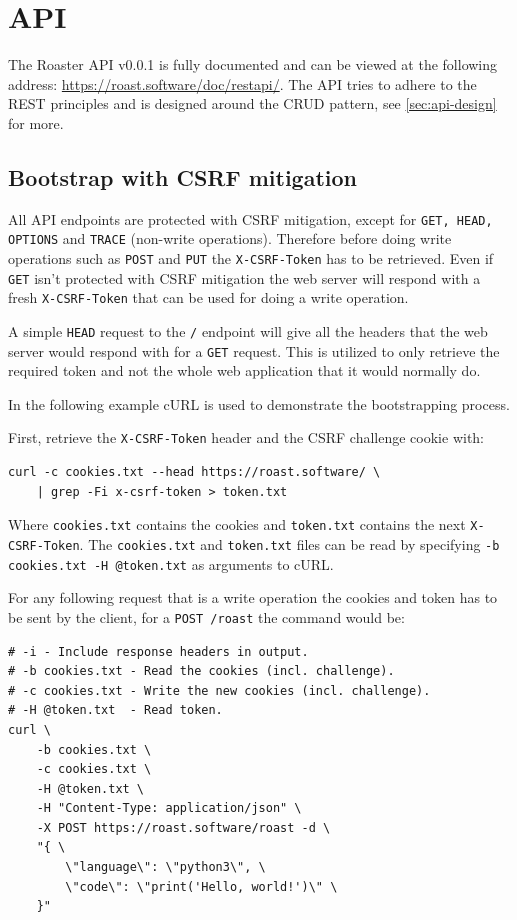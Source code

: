 \documentclass[12pt,a4paper]{report}
\begin{document}

\chapter{API}
The Roaster API v0.0.1 is fully documented and can be viewed at the following address: \url{https://roast.software/doc/restapi/}. The API tries to adhere to the REST principles and is designed around the CRUD pattern, see \autoref{sec:api-design} for more.

\section{Bootstrap with CSRF mitigation}
\label{sec:api-bootstrap}
All API endpoints are protected with CSRF mitigation, except for \texttt{GET, HEAD, OPTIONS} and \texttt{TRACE} (non-write operations). Therefore before doing write operations such as \texttt{POST} and \texttt{PUT} the \texttt{X-CSRF-Token} has to be retrieved. Even if \texttt{GET} isn't protected with CSRF mitigation the web server will respond with a fresh \texttt{X-CSRF-Token} that can be used for doing a write operation.

A simple \texttt{HEAD} request to the \texttt{/} endpoint will give all the headers that the web server would respond with for a \texttt{GET} request. This is utilized to only retrieve the required token and not the whole web application that it would normally do.

In the following example cURL is used to demonstrate the bootstrapping process.

First, retrieve the \texttt{X-CSRF-Token} header and the CSRF challenge cookie with:
\begin{verbatim}
curl -c cookies.txt --head https://roast.software/ \
    | grep -Fi x-csrf-token > token.txt
\end{verbatim}
Where \texttt{cookies.txt} contains the cookies and \texttt{token.txt} contains the next \texttt{X-CSRF-Token}.
The \texttt{cookies.txt} and \texttt{token.txt} files can be read by specifying \texttt{-b cookies.txt -H @token.txt} as arguments to cURL.

\newpage
For any following request that is a write operation the cookies and token has to be sent by the client, for a \texttt{POST /roast} the command would be:
\begin{verbatim}
# -i - Include response headers in output.
# -b cookies.txt - Read the cookies (incl. challenge).
# -c cookies.txt - Write the new cookies (incl. challenge).
# -H @token.txt  - Read token.
curl \
    -b cookies.txt \
    -c cookies.txt \
    -H @token.txt \
    -H "Content-Type: application/json" \
    -X POST https://roast.software/roast -d \
    "{ \
        \"language\": \"python3\", \
        \"code\": \"print('Hello, world!')\" \
    }"
\end{verbatim}
\end{document}
